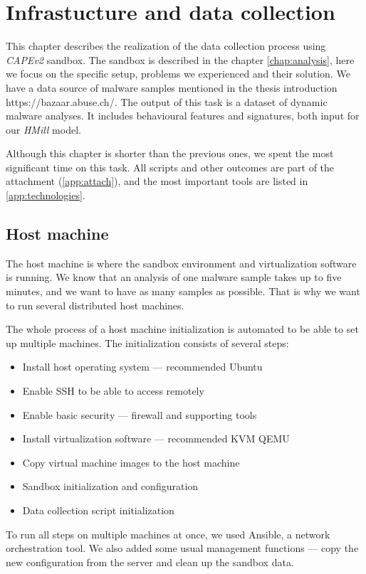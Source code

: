 \chapter{Infrastucture and data collection} \label{chap:infrastructure}
This chapter describes the realization of the data collection process using \emph{CAPEv2} sandbox. The sandbox is described in the chapter \ref{chap:analysis}, here we focus on the specific setup, problems we experienced and their solution. We have a data source of malware samples mentioned in the thesis introduction https://bazaar.abuse.ch/. The output of this task is a dataset of dynamic malware analyses. It includes behavioural features and signatures, both input for our \emph{HMill} model.

Although this chapter is shorter than the previous ones, we spent the most significant time on this task. All scripts and other outcomes are part of the attachment (\ref{app:attach}), and the most important tools are listed in \ref{app:technologies}.

\section{Host machine}
The host machine is where the sandbox environment and virtualization software is running. We know that an analysis of one malware sample takes up to five minutes, and we want to have as many samples as possible. That is why we want to run several distributed host machines. 

The whole process of a host machine initialization is automated to be able to set up multiple machines. The initialization consists of several steps:
\begin{itemize}
    \itemsep0em 
    \item Install host operating system --- recommended Ubuntu
    \item Enable SSH to be able to access remotely
    \item Enable basic security --- firewall and supporting tools
    \item Install virtualization software --- recommended KVM QEMU
    \item Copy virtual machine images to the host machine
    \item Sandbox initialization and configuration
    \item Data collection script initialization
\end{itemize}

To run all steps on multiple machines at once, we used Ansible, a network orchestration tool. We also added some usual management functions --- copy the new configuration from the server and clean up the sandbox data.

